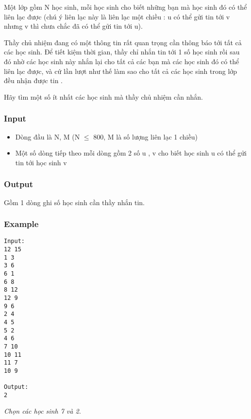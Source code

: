 

Một lớp gồm N học sinh, mỗi học sinh cho biết những bạn mà học sinh đó có thể liên lạc được (chú ý liên lạc này là liên lạc một chiều : u có thể gửi tin tới v nhưng v thì chưa chắc đã có thể gửi tin tới u).

Thầy chủ nhiệm đang có một thông tin rất quan trọng cần thông báo tới tất cả các học sinh. Để tiết kiệm thời gian, thầy chỉ nhắn tin tới 1 số học sinh rồi sau đó nhờ các học sinh này nhắn lại cho tất cả các bạn mà các học sinh đó có thể liên lạc được, và cứ lần lượt như thế làm sao cho tất cả các học sinh trong lớp đều nhận được tin .

Hãy tìm một số ít nhất các học sinh mà thầy chủ nhiệm cần nhắn.

\subsubsection{Input}
\begin{itemize}
	\item Dòng đầu là N, M (N  $\le$  800, M là số lượng liên lạc 1 chiều)
	\item Một số dòng tiếp theo mỗi dòng gồm 2 số u , v cho biết học sinh u có thể gửi tin tới học sinh v
\end{itemize}

\subsubsection{Output}

Gồm 1 dòng ghi số học sinh cần thầy nhắn tin.

\subsubsection{Example}
\begin{verbatim}
Input:
12 15
1 3
3 6
6 1
6 8
8 12
12 9
9 6
2 4
4 5
5 2
4 6
7 10
10 11
11 7
10 9

Output:
2
\end{verbatim}

\emph{Chọn các học sinh 7 và 2. }
